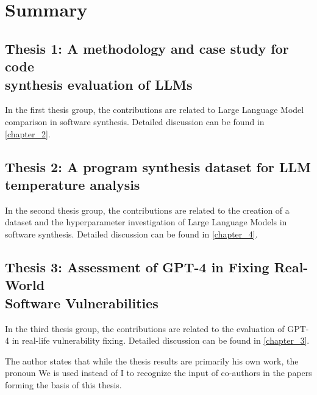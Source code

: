 \chapter*{Summary}




\section*{Thesis 1: A methodology and case study for code \\ \mbox{synthesis} evaluation of LLMs}



\vspace{0.7cm}
\noindent
In the first thesis group, the contributions are related to Large Language Model comparison in software synthesis. Detailed discussion can be found in \autoref{chapter_2}.



\section*{Thesis 2: A program synthesis dataset for LLM \\ \mbox{temperature} analysis}



\vspace{0.7cm}
\noindent
In the second thesis group, the contributions are related to the creation of a dataset and the hyperparameter investigation of Large Language Models in software synthesis. Detailed discussion can be found in \autoref{chapter_4}.
\newpage


\section*{Thesis 3: Assessment of GPT-4 in Fixing Real-World \\ \mbox{Software} Vulnerabilities}



\vspace{0.7cm}

\noindent
In the third thesis group, the contributions are related to the evaluation of GPT-4 in real-life vulnerability fixing. Detailed discussion can be found in \autoref{chapter_3}.



\vspace*{1cm}

The author states that while the thesis results are primarily his own work, the
pronoun We is used instead of I to recognize the input of co-authors in the papers
forming the basis of this thesis.
